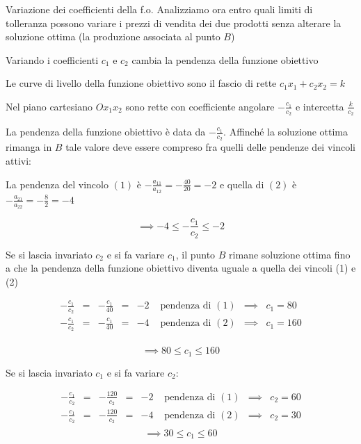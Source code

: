 \documentclass{beamer}
\begin{document}
\begin{frame}[allowframebreaks]{Variazione dei coefficienti della f.o.}
 Analizziamo ora entro quali limiti di tolleranza possono variare
 i prezzi di vendita dei due prodotti senza alterare la soluzione
 ottima (la produzione associata al punto $B$)

 Variando i coefficienti $c_1$ e $c_2$ cambia la pendenza della
 funzione obiettivo

 Le curve di livello della funzione obiettivo sono il fascio di
 rette $c_1 x_1 + c_2 x_2 = k$

 Nel piano cartesiano $Ox_1x_2$ sono rette con coefficiente angolare
 $-\frac{c_1}{c_2}$ e intercetta $\frac{k}{c_2}$

\framebreak

La pendenza della funzione obiettivo è data da $-\frac{c_1}{c_2}$.
Affinché la soluzione ottima rimanga in $B$ tale valore deve essere
compreso fra quelli delle pendenze dei vincoli attivi:

La pendenza del vincolo $(1)$ è $-\frac{a_{11}}{a_{12}}=-\frac{40}{20}=-2$
e quella di $(2)$ è $-\frac{a_{21}}{a_{22}}=-\frac{8}{2}=-4$

\[\implies -4\leq-\frac{c_1}{c_2}\leq -2\]

\framebreak

Se si lascia invariato $c_2$ e si fa variare $c_1$,
il punto $B$ rimane soluzione ottima fino a che la
pendenza della funzione obiettivo diventa uguale a
quella dei vincoli (1) e (2)

\[
\begin{array}{rlrlrlrlrlr}
 -\frac{c_1}{c_2}&=&-\frac{c_1}{40}&=&-2&\text{ pendenza di }(1)&\implies&c_1=80\\	
 -\frac{c_1}{c_2}&=&-\frac{c_1}{40}&=&-4&\text{ pendenza di }(2)&\implies&c_1=160\\
\end{array}
\]

\[\implies  80 \leq c_1 \leq 160 \]

\framebreak

Se si lascia invariato $c_1$ e si fa variare $c_2$:

\[
\begin{array}{rlrlrlrlrlr}
 -\frac{c_1}{c_2}&=&-\frac{120}{c_2}&=&-2&\text{ pendenza di }(1)&\implies&c_2=60\\	
 -\frac{c_1}{c_2}&=&-\frac{120}{c_2}&=&-4&\text{ pendenza di }(2)&\implies&c_2=30\\
\end{array}
\]
\[\implies  30 \leq c_1 \leq 60 \]


\end{frame}
\end{document}

